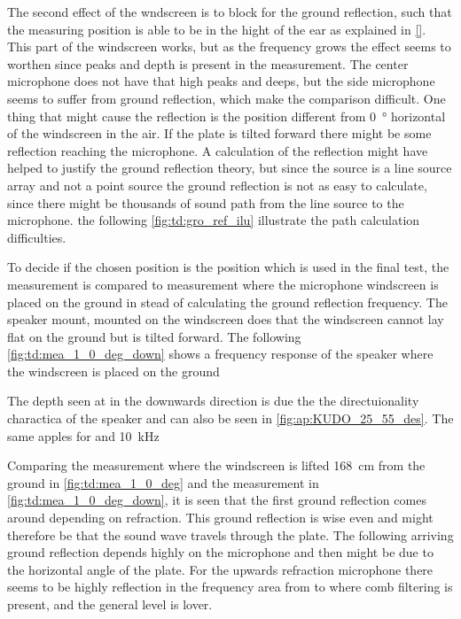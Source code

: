 The second effect of the wndscreen is to block for the ground reflection, such that the measuring position is able to be in the hight of the ear as explained in \autoref{}. This part of the windscreen  works, but as the frequency grows the effect seems to worthen since peaks and depth is present in the measurement. The center microphone does not have that high peaks and deeps, but the side microphone seems to suffer from ground reflection, which make the comparison difficult. One thing that might cause the reflection is the position different from \SI{0}{\degree} horizontal of the windscreen in the air. If the plate is tilted forward there might be some reflection reaching the microphone. A calculation of the reflection might have helped to justify the ground reflection theory, but since the source is a line source array and not a point source the ground reflection is not as easy to calculate, since there might be thousands of sound path from the line source to the microphone. the following \autoref{fig:td:gro_ref_ilu} illustrate the path calculation difficulties. 



To decide if the chosen position is the position which is used in the final test, the measurement is compared to measurement where the microphone windscreen is placed on the ground in stead of calculating the ground reflection frequency. The speaker mount, mounted on the windscreen does that the windscreen cannot lay flat on the ground but is tilted forward. The following \autoref{fig:td:mea_1_0_deg_down} shows a frequency response of the speaker where the windscreen is placed on the ground  


The depth seen at  in the downwards direction is due the the directuionality charactica of the speaker and can also be seen in \autoref{fig:ap:KUDO_25_55_des}. The same apples for  and \SI{10}{\kilo\hertz}

Comparing the measurement where the windscreen is lifted \SI{168}{\centi\meter} from the ground in \autoref{fig:td:mea_1_0_deg} and the measurement in \autoref{fig:td:mea_1_0_deg_down}, it is seen that the first ground reflection comes around  depending on refraction. This ground reflection is \db wise even and might therefore be that the sound wave travels through the plate. The following arriving ground reflection depends highly on the microphone and then might be due to the horizontal angle of the plate. For the upwards refraction microphone there seems to be highly reflection in the frequency area from  to  where comb filtering is present, and the general level is lover.

